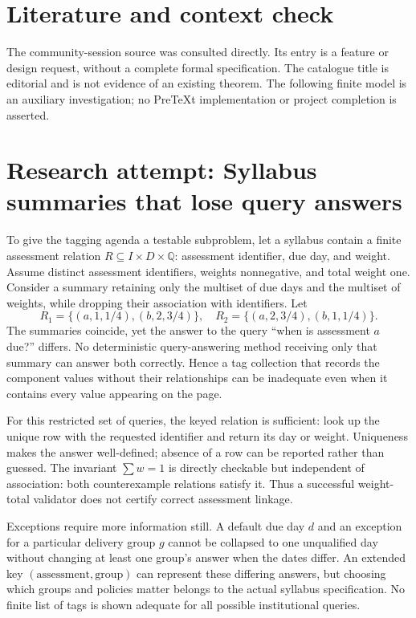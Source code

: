 \documentclass[11pt]{article}
\begin{document}
\section{Literature and context check}
The community-session source was consulted directly. Its entry is a feature or design request, without a complete formal specification. The catalogue title is editorial and is not evidence of an existing theorem. The following finite model is an auxiliary investigation; no PreTeXt implementation or project completion is asserted.
\section{Research attempt: Syllabus summaries that lose query answers}
To give the tagging agenda a testable subproblem, let a syllabus contain a finite assessment relation $R\subseteq I\times D\times\mathbb Q$: assessment identifier, due day, and weight. Assume distinct assessment identifiers, weights nonnegative, and total weight one. Consider a summary retaining only the multiset of due days and the multiset of weights, while dropping their association with identifiers. Let
\[
R_1=\{(a,1,1/4),(b,2,3/4)\},\quad
R_2=\{(a,2,3/4),(b,1,1/4)\}.
\]
The summaries coincide, yet the answer to the query ``when is assessment $a$ due?'' differs. No deterministic query-answering method receiving only that summary can answer both correctly. Hence a tag collection that records the component values without their relationships can be inadequate even when it contains every value appearing on the page.

For this restricted set of queries, the keyed relation is sufficient: look up the unique row with the requested identifier and return its day or weight. Uniqueness makes the answer well-defined; absence of a row can be reported rather than guessed. The invariant $\sum w=1$ is directly checkable but independent of association: both counterexample relations satisfy it. Thus a successful weight-total validator does not certify correct assessment linkage.

Exceptions require more information still. A default due day $d$ and an exception for a particular delivery group $g$ cannot be collapsed to one unqualified day without changing at least one group's answer when the dates differ. An extended key $(\text{assessment},\text{group})$ can represent these differing answers, but choosing which groups and policies matter belongs to the actual syllabus specification. No finite list of tags is shown adequate for all possible institutional queries.
\end{document}
